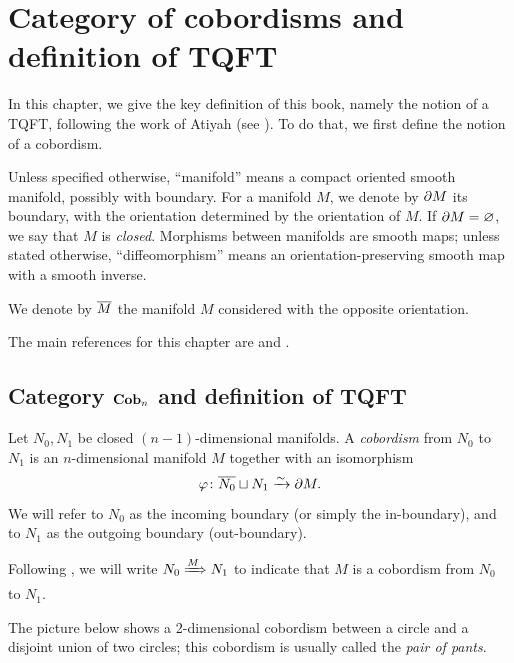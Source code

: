 \chapter{Category of cobordisms and definition of TQFT}\label{c:cobordisms}

In this chapter, we give the key definition of this book, namely the notion of a
TQFT, following the work of Atiyah (see ). To do that, we first
define the notion of a cobordism.

Unless specified otherwise, ``manifold'' means a compact oriented smooth
manifold, possibly with boundary. For a manifold $M$, we denote by $\partial M$ its
boundary, with the orientation determined by the orientation of $M$. If $\partial
M=\varnothing$, we say that $M$ is \emph{closed}. Morphisms between manifolds
are smooth maps; unless stated otherwise, ``diffeomorphism'' means an
orientation-preserving smooth map with a smooth inverse.

We denote by $\overline{M}$ the manifold $M$ considered with the
opposite orientation.

The main references for this chapter are  and
.

\section{Category $\mathbf{Cob}_n$ and definition of TQFT}\label{s:TQFT-def}
\begin{definition}\label{d:cobordism}
Let $N_0, N_1$ be closed $(n-1)$-dimensional manifolds. A \emph{cobordism}
from $N_0$ to $N_1$ is an $n$-dimensional manifold $M$ together with
an isomorphism
$$
  \varphi\colon \overline{N_0}\sqcup N_1 \xrightarrow{\sim} \partial M.
$$
We will refer to $N_0$ as the incoming boundary (or simply the in-boundary),
and to $N_1$ as the outgoing boundary (out-boundary).

Following , we will write $N_0\xRightarrow{M} N_1$ to indicate that $M$ is a
cobordism from $N_0$ to $N_1$.
\end{definition}

The picture below shows a 2-dimensional cobordism between a circle and a
disjoint union of two circles; this cobordism is usually called the \emph{pair
of pants}.
\begin{center}
\end{center}

